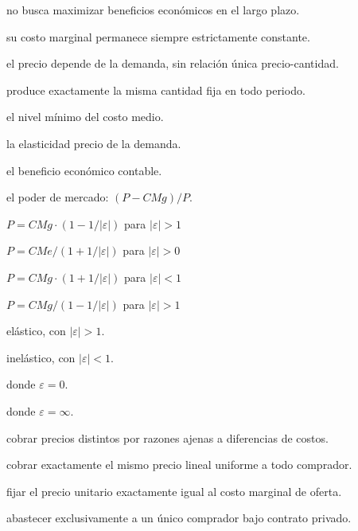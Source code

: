 \begin{opts}
    \item no busca maximizar beneficios económicos en el largo plazo.
    \item su costo marginal permanece siempre estrictamente constante.
    \item el precio depende de la demanda, sin relación única precio-cantidad.
    \item produce exactamente la misma cantidad fija en todo periodo.
\end{opts}

\begin{opts}
    \item el nivel mínimo del costo medio.
    \item la elasticidad precio de la demanda.
    \item el beneficio económico contable.
    \item el poder de mercado: $(P-CMg)/P$.
\end{opts}

\begin{opts}
    \item $P = CMg \cdot (1 - 1/|\varepsilon|)$ para $|\varepsilon|>1$
    \item $P = CMe / (1 + 1/|\varepsilon|)$ para $|\varepsilon|>0$
    \item $P = CMg \cdot (1 + 1/|\varepsilon|)$ para $|\varepsilon|<1$
    \item $P = CMg / (1 - 1/|\varepsilon|)$ para $|\varepsilon|>1$
\end{opts}

\begin{opts}
    \item elástico, con $|\varepsilon|>1$.
    \item inelástico, con $|\varepsilon|<1$.
    \item donde $\varepsilon=0$.
    \item donde $\varepsilon=\infty$.
\end{opts}

\begin{opts}
    \item cobrar precios distintos por razones ajenas a diferencias de costos.
    \item cobrar exactamente el mismo precio lineal uniforme a todo comprador.
    \item fijar el precio unitario exactamente igual al costo marginal de oferta.
    \item abastecer exclusivamente a un único comprador bajo contrato privado.
\end{opts}

